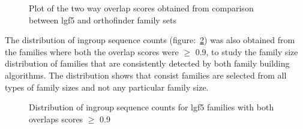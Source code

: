 \documentclass{article}
\begin{document}
		\begin{figure}[h!]
			\caption{Plot of the two way overlap scores obtained from comparison between lgf5 and orthofinder family sets}
			\label{fig:scatter_lgf5_vs_orthofinder_overlap_lgf5}
		\end{figure}
		
		The distribution of ingroup sequence counts (figure:~\ref{fig:hist_seq_ct_lgf5_vs_orthofinder_90percent_overlap}) was also obtained from the families where both the overlap scores were $\geq$ 0.9, to study the family size distribution of families that are consistently detected by both family building algorithms. The distribution shows that consist families are selected from all types of family sizes and not any particular family size.
		\begin{figure}[h!]
			\caption{Distribution of ingroup sequence counts for lgf5 families with both overlaps scores $\geq$ 0.9 }
			\label{fig:hist_seq_ct_lgf5_vs_orthofinder_90percent_overlap}
		\end{figure}
		
\end{document}
